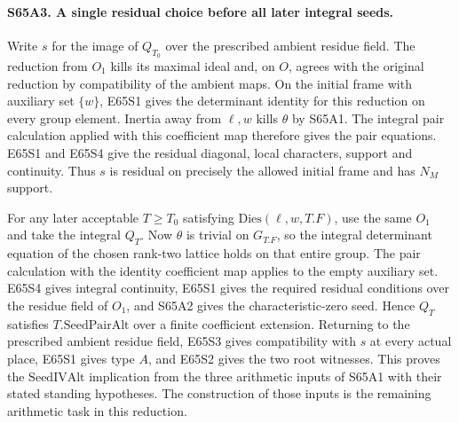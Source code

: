 \paragraph{S65A3. A single residual choice before all later integral seeds.}
Write $s$ for the image of $Q_{T_0}$ over the prescribed ambient
residue field. The reduction from $O_1$ kills its maximal ideal and,
on $O$, agrees with the original reduction by compatibility of the
ambient maps. On the initial frame with auxiliary set $\{w\}$,
E65S1 gives the determinant identity for this reduction on every
group element. Inertia away from $\ell,w$ kills $\theta$ by S65A1.
The integral pair calculation applied with this coefficient map
therefore gives the pair equations. E65S1 and E65S4 give the
residual diagonal, local characters, support and continuity. Thus
$s$ is residual on precisely the allowed initial frame and has
$N_M$ support.

For any later acceptable $T\ge T_0$ satisfying
$\mathrm{Dies}(\ell,w,T.F)$, use the same $O_1$ and take the
integral $Q_T$. Now $\theta$ is trivial on $G_{T.F}$, so the
integral determinant equation of the chosen rank-two lattice holds
on that entire group. The pair calculation with the identity
coefficient map applies to the empty auxiliary set. E65S4 gives
integral continuity, E65S1 gives the required residual conditions
over the residue field of $O_1$, and S65A2 gives the characteristic-zero
seed. Hence $Q_T$ satisfies $T.\mathrm{SeedPairAlt}$ over a finite
coefficient extension. Returning to the prescribed ambient residue
field, E65S3 gives compatibility with $s$ at every actual place,
E65S1 gives type $A$, and E65S2 gives the two root witnesses.
This proves the $\mathrm{SeedIVAlt}$ implication from the three
arithmetic inputs of S65A1 with their stated standing hypotheses.
The construction of those inputs is the remaining arithmetic task
in this reduction.
